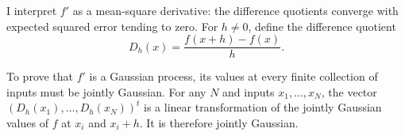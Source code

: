 \documentclass[11pt,letterpaper]{article}
\begin{document}

I interpret $f'$ as a mean-square derivative: the difference quotients
converge with expected squared error tending to zero.
For $h\ne0$, define the difference quotient
\[
  D_h(x)=\frac{f(x+h)-f(x)}h.
\]

To prove that $f'$ is a Gaussian process, its values at every finite
collection of inputs must be jointly Gaussian.
For any $N$ and inputs $x_1,\ldots,x_N$, the vector
$(D_h(x_1),\ldots,D_h(x_N))^t$ is a linear transformation of the
jointly Gaussian values of $f$ at $x_i$ and $x_i+h$.
It is therefore jointly Gaussian.
\end{document}
